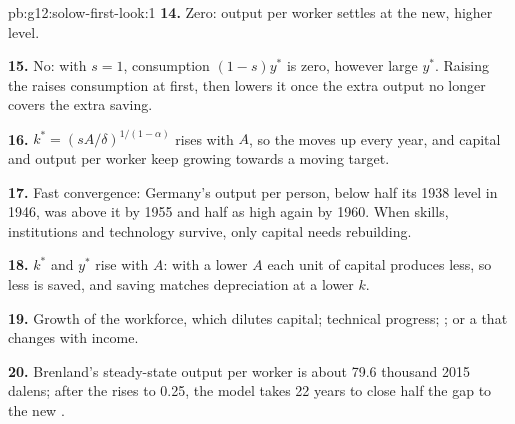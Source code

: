 \begin{solution}{pb:g12:solow-first-look:1}
\textbf{14.} Zero: output per worker settles at the new, higher level.

\textbf{15.} No: with $s = 1$, consumption $(1 - s)y^*$ is zero, however large $y^*$. Raising the  raises consumption at first, then lowers it once the extra output
no longer covers the extra saving.

\textbf{16.} $k^* = (sA/\delta)^{1/(1 - \alpha)}$ rises with $A$, so the  moves up every year, and capital and output per worker keep growing towards a moving
target.

\textbf{17.} Fast convergence: Germany's output per person, below half its 1938 level in 1946, was above it by 1955 and half as high again by 1960. When skills,
institutions and technology survive, only capital needs rebuilding.

\textbf{18.} $k^*$ and $y^*$ rise with $A$: with a lower $A$ each unit of capital produces less, so less is saved, and saving matches depreciation at a lower $k$.

\textbf{19.} Growth of the workforce, which dilutes capital; technical progress; ; or a  that changes with income.

\textbf{20.} Brenland's steady-state output per worker is about 79.6 thousand 2015 dalens; after the  rises to 0.25, the model takes 22 years to close half the gap
to the new .
\end{solution}
